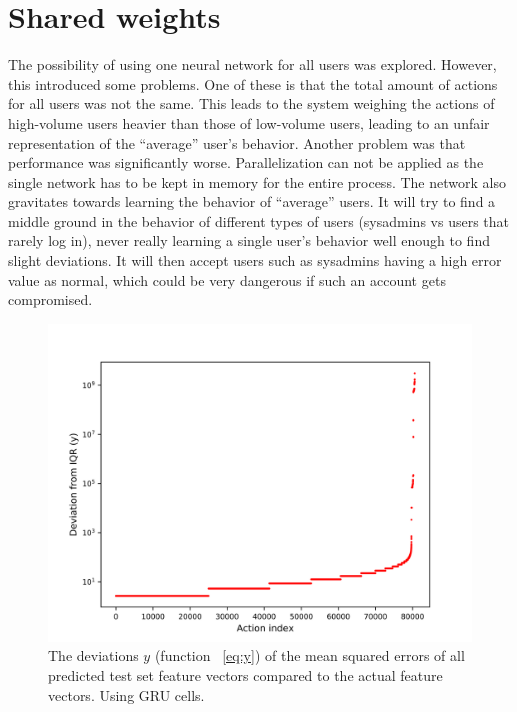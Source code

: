 \section{Shared weights}
The possibility of using one neural network for all users was explored. However, this introduced some problems. One of these is that the total amount of actions for all users was not the same. This leads to the system weighing the actions of high-volume users heavier than those of low-volume users, leading to an unfair representation of the \enquote{average} user's behavior. Another problem was that performance was significantly worse. Parallelization can not be applied as the single network has to be kept in memory for the entire process. The network also gravitates towards learning the behavior of \enquote{average} users. It will try to find a middle ground in the behavior of different types of users (sysadmins vs users that rarely log in), never really learning a single user's behavior well enough to find slight deviations. It will then accept users such as sysadmins having a high error value as normal, which could be very dangerous if such an account gets compromised.

\begin{figure}
	\begin{center}
		\includegraphics[scale=6.0]{experiments/cell/deviations/gru}
	\end{center}
	\caption{The deviations \(y\) (function ~\ref{eq:y}) of the mean squared errors of all predicted test set feature vectors compared to the actual feature vectors. Using GRU cells.~\label{fig:gru_deviations}}
\end{figure}

